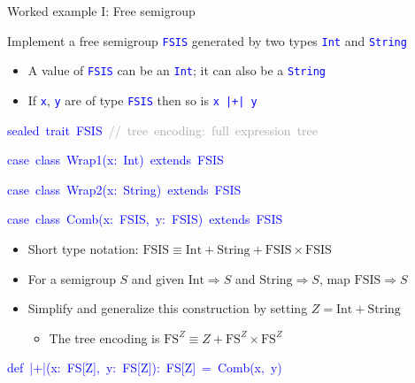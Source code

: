 \documentclass[english,,russian]{beamer}
\newenvironment{lyxcode}
  {\par\begin{list}{}{
    \setlength{\rightmargin}{\leftmargin}
    \setlength{\listparindent}{0pt}%
    \raggedright
    \setlength{\itemsep}{0pt}
    \setlength{\parsep}{0pt}
    \normalfont\ttfamily}%
   \def\{{\char`\{}
   \def\}{\char`\}}
   \def\textasciitilde{\char`\~}
   \item[]}
  {\end{list}}
\begin{document}
\begin{frame}{Worked example I: Free semigroup}

{\footnotesize{}\vspace{-0.15cm}}Implement a free semigroup \texttt{\textcolor{blue}{\footnotesize{}FSIS}}
generated by two types \texttt{\textcolor{blue}{\footnotesize{}Int}}
and \texttt{\textcolor{blue}{\footnotesize{}String}} 
\begin{itemize}
\item A value of \texttt{\textcolor{blue}{\footnotesize{}FSIS}} can be an
\texttt{\textcolor{blue}{\footnotesize{}Int}}; it can also be a \texttt{\textcolor{blue}{\footnotesize{}String}} 
\item If \texttt{\textcolor{blue}{\footnotesize{}x}}, \texttt{\textcolor{blue}{\footnotesize{}y}}
are of type \texttt{\textcolor{blue}{\footnotesize{}FSIS}} then so
is \texttt{\textcolor{blue}{\footnotesize{}x |+| y}} 
\end{itemize}
\begin{lyxcode}
\textcolor{blue}{\footnotesize{}sealed~trait~FSIS~}\textcolor{darkgray}{\footnotesize{}//~tree~encoding:~full~expression~tree}{\footnotesize\par}

\textcolor{blue}{\footnotesize{}case~class~Wrap1(x:~Int)~extends~FSIS}{\footnotesize\par}

\textcolor{blue}{\footnotesize{}case~class~Wrap2(x:~String)~extends~FSIS}{\footnotesize\par}

\textcolor{blue}{\footnotesize{}case~class~Comb(x:~FSIS,~y:~FSIS)~extends~FSIS}{\footnotesize\par}
\end{lyxcode}
\begin{itemize}
\item {\footnotesize{}\vspace{-0.15cm}}Short type notation: $\text{FSIS}\equiv\text{Int}+\text{String}+\text{FSIS}\times\text{FSIS}$ 
\item For a semigroup $S$ and given $\text{Int}\Rightarrow S$ and $\text{String}\Rightarrow S$,
map $\text{FSIS}\Rightarrow S$
\item Simplify and generalize this construction by setting $Z=\text{Int}+\text{String}$
\begin{itemize}
\item The tree encoding is $\text{FS}^{Z}\equiv Z+\text{FS}^{Z}\times\text{FS}^{Z}$
\end{itemize}
\end{itemize}
\begin{lyxcode}
\textcolor{blue}{\footnotesize{}def~|+|(x:~FS{[}Z{]},~y:~FS{[}Z{]}):~FS{[}Z{]}~=~Comb(x,~y)}{\footnotesize\par}


\end{lyxcode}
\end{frame}
\end{document}
